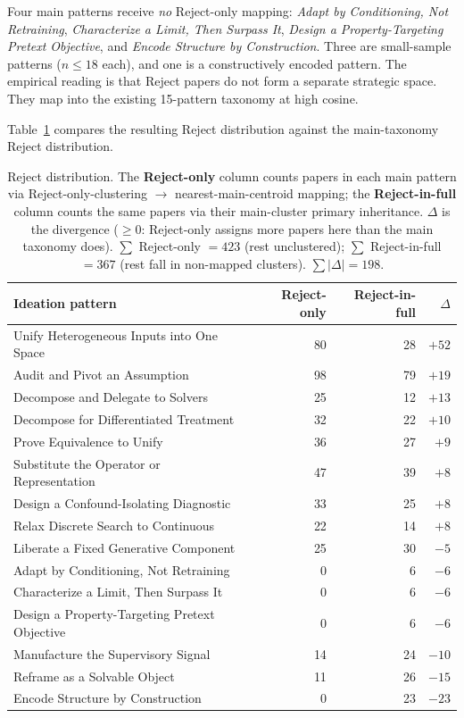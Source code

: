 \documentclass[10pt,a4paper]{article}
\begin{document}
Four main patterns receive \emph{no} Reject-only mapping: \emph{Adapt by Conditioning, Not Retraining}, \emph{Characterize a Limit, Then Surpass It}, \emph{Design a Property-Targeting Pretext Objective}, and \emph{Encode Structure by Construction}. Three are small-sample patterns ($n \leq 18$ each), and one is a constructively encoded pattern. The empirical reading is that Reject papers do not form a separate strategic space. They map into the existing 15-pattern taxonomy at high cosine.

Table~\ref{tab:rejmap} compares the resulting Reject distribution against the main-taxonomy Reject distribution.

\begin{table}[!htbp]
\centering
\caption{Reject distribution. The \textbf{Reject-only} column counts papers in each main pattern via Reject-only-clustering $\to$ nearest-main-centroid mapping; the \textbf{Reject-in-full} column counts the same papers via their main-cluster primary inheritance. $\Delta$ is the divergence ($\geq 0$: Reject-only assigns more papers here than the main taxonomy does). $\sum$ Reject-only $= 423$ (rest unclustered); $\sum$ Reject-in-full $= 367$ (rest fall in non-mapped clusters). $\sum |\Delta| = 198$.}
\label{tab:rejmap}
\small
\begin{tabular}{p{7cm} rrr}
\toprule
\textbf{Ideation pattern} & \textbf{Reject-only} & \textbf{Reject-in-full} & \textbf{$\Delta$} \\
\midrule
Unify Heterogeneous Inputs into One Space     & 80 & 28 & $+52$ \\
Audit and Pivot an Assumption                 & 98 & 79 & $+19$ \\
Decompose and Delegate to Solvers             & 25 & 12 & $+13$ \\
Decompose for Differentiated Treatment        & 32 & 22 & $+10$ \\
Prove Equivalence to Unify                    & 36 & 27 & $+9$ \\
Substitute the Operator or Representation     & 47 & 39 & $+8$ \\
Design a Confound-Isolating Diagnostic        & 33 & 25 & $+8$ \\
Relax Discrete Search to Continuous           & 22 & 14 & $+8$ \\
Liberate a Fixed Generative Component         & 25 & 30 & $-5$ \\
Adapt by Conditioning, Not Retraining         &  0 &  6 & $-6$ \\
Characterize a Limit, Then Surpass It         &  0 &  6 & $-6$ \\
Design a Property-Targeting Pretext Objective &  0 &  6 & $-6$ \\
Manufacture the Supervisory Signal            & 14 & 24 & $-10$ \\
Reframe as a Solvable Object                  & 11 & 26 & $-15$ \\
Encode Structure by Construction              &  0 & 23 & $-23$ \\
\bottomrule
\end{tabular}
\end{table}
\end{document}
